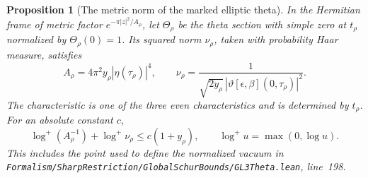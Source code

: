 \documentclass[a4paper,11pt]{article}
\newtheorem{proposition}{Proposition}[section]
\theoremstyle{definition}
\theoremstyle{remark}
\newcommand{\srcloc}[2]{{\small\nolinkurl{#1.lean}}, line~#2}
\numberwithin{equation}{section}
\begin{document}
\begin{proposition}[The metric norm of the marked elliptic theta]\label{prop:ellnorm56}
In the Hermitian frame of metric factor \(e^{-\pi|z|^2/A_\rho}\),
let \(\Theta_\rho\) be the theta section with simple zero at
\(t_\rho\) normalized by \(\Theta_\rho(0)=1\). Its squared norm
\(\nu_\rho\), taken with probability Haar measure, satisfies
\begin{equation}
 A_\rho=4\pi^2 y_\rho|\eta(\tau_\rho)|^4,\qquad
 \nu_\rho=\frac{1}{\sqrt{2y_\rho}\,
            |\vartheta[\epsilon,\beta](0,\tau_\rho)|^2}.
                                                      \label{eq:ellnorm56}
\end{equation}
The characteristic is one of the three even characteristics and
is determined by \(t_\rho\). For an absolute constant \(c\),
\[
       \log^+(A_\rho^{-1})+\log^+\nu_\rho\le c(1+y_\rho),
             \qquad \log^+u=\max(0,\log u).
\]
This includes the point used to define the normalized vacuum in
\srcloc{Formalism/SharpRestriction/GlobalSchurBounds/GL3Theta}{198}.
\end{proposition}
\end{document}
